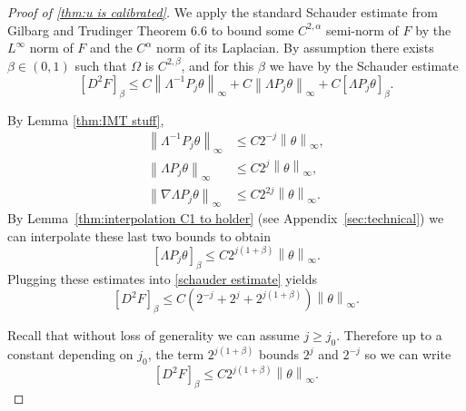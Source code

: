 \documentclass[11pt]{amsart}
\theoremstyle{remark}
\theoremstyle{definition}
\newcommand{\norm}[1]{\left\lVert#1\right\rVert}
\newcommand{\paren}[1]{\left( #1 \right)}
\newcommand{\bracket}[1]{\left[ #1 \right]}
\newcommand{\grad}{\nabla}
\newcommand{\Laplace}{\Delta}
\begin{document}
\begin{proof}[Proof of \ref{thm:u is calibrated}]



We apply the standard Schauder estimate from Gilbarg and Trudinger \cite{GiTr} Theorem 6.6 to bound some $C^{2,\alpha}$ semi-norm of $F$ by the $L^\infty$ norm of $F$ and the $C^\alpha$ norm of its Laplacian.  By assumption there exists $\beta \in (0,1)$ such that $\Omega$ is $C^{2,\beta}$, and for this $\beta$ we have by the Schauder estimate
\begin{equation} \label{schauder estimate} \bracket{D^2 F}_{\beta} \leq C \norm{\Lambda^{-1} P_j \theta}_\infty + C \norm{\Lambda P_j \theta}_\infty + C \bracket{\Lambda P_j \theta}_{\beta}. \end{equation}

By Lemma \ref{thm:IMT stuff},
\begin{align*} 
\norm{\Lambda^{-1} P_j \theta}_\infty &\leq C 2^{-j} \norm{\theta}_\infty, \\
\norm{\Lambda P_j \theta}_\infty &\leq C 2^j \norm{\theta}_\infty, \\
\norm{\grad \Lambda P_j \theta}_\infty &\leq C 2^{2j} \norm{\theta}_\infty. 
\end{align*}
By Lemma~\ref{thm:interpolation C1 to holder} (see Appendix~\ref{sec:technical}) we can interpolate these last two bounds to obtain
\[ \bracket{\Lambda P_j \theta}_\beta \leq C 2^{j(1+\beta)} \norm{\theta}_\infty. \]
Plugging these estimates into \eqref{schauder estimate} yields
\[ \bracket{D^2 F}_\beta \leq C \paren{2^{-j} + 2^j + 2^{j(1+\beta)}} \norm{\theta}_\infty. \]

Recall that without loss of generality we can assume $j \geq j_0$.  Therefore up to a constant depending on $j_0$, the term $2^{j(1+\beta)}$ bounds $2^j$ and $2^{-j}$ so we can write
\[ \bracket{D^2 F}_\beta \leq C 2^{j(1+\beta)} \norm{\theta}_\infty. \]


\end{proof}
\end{document}
